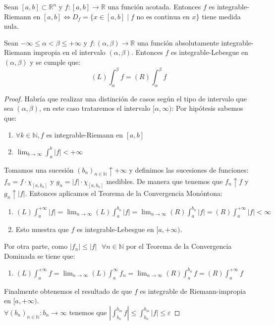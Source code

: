 \begin{teorema}
    Sean $[a, b]\subset \mathbb{R}^n$ y $f: [a, b] \to \mathbb{R}$ una función acotada. Entonces $f$ es integrable-Riemann en $[a, b] \iff D_f = \{ x \in [a, b] \mid f \text{ no es continua en } x \}$ tiene medida nula.
\end{teorema}

\begin{teorema}
    Sean $-\infty \leq \alpha < \beta \leq +\infty$ y $f: (\alpha, \beta) \to \mathbb{R}$ una función absolutamente integrable-Riemann impropia en el intervalo $(\alpha, \beta)$. Entonces $f$ es integrable-Lebesgue en $(\alpha, \beta)$ y se cumple que:
    $$ (L) \int_{\alpha}^{\beta}f = (R)\int_{\alpha}^{\beta}f $$
\end{teorema}
\begin{proof}
    Habría que realizar una distinción de casos según el tipo de intervalo que sea $(\alpha, \beta)$, en este caso trataremos el intervalo $[\alpha, \infty)$:
    Por hipótesis sabemos que:
    \begin{enumerate}
        \item $\forall k \in \mathbb{N}, f$ es integrable-Riemann en $[a, b]$
        \item $\lim_{b \to \infty} \int_{a}^{b}|f| < +\infty$
    \end{enumerate}
    Tomamos una sucesión $(b_n)_{n \in \mathbb{N}} \uparrow +\infty$ y definimos las sucesiones de funciones: $f_n = f\cdot\chi_{[a, b_n]}$ y $g_n = |f|\cdot\chi_{[a, b_n]}$ medibles. De manera que tenemos que $f_n \uparrow f$ y $g_n \uparrow |f|$. Entonces aplicamos el Teorema de la Convergencia Monóntona:
    \begin{enumerate}
        \item $(L)\int_{a}^{+\infty}|f| = \lim_{n \to \infty}(L)\int_{a}^{b_n}|f| = \lim_{n \to \infty}(R)\int_{a}^{b_n}|f| = (R)\int_{a}^{+\infty}|f| < \infty$
        \item Esto muestra que $f$ es integrable-Lebesgue en $[a, +\infty)$.
    \end{enumerate}
    Por otra parte, como $|f_n| \leq |f| \text{  }\forall n \in \mathbb{N}$ por el Teorema de la Convergencia Dominada se tiene que:
    \begin{enumerate}
        \item $(L)\int_{a}^{+\infty}f = \lim_{n \to \infty}(L)\int_{a}^{\infty}f_n = \lim_{n \to \infty}(R)\int_{a}^{b_n}f = (R)\int_{a}^{+\infty}f$
    \end{enumerate}
    Finalmente obtenemos el resultado de que $f$ es integrable de Riemann-impropia en $[a, +\infty)$.
    \\$\forall (b_n)_{n \in \mathbb{N}} : b_n \to \infty$ tenemos que $|\int_{b_n}^{b_m}f| \leq \int_{b_n}^{b_m}|f| \leq \varepsilon$
\end{proof}
